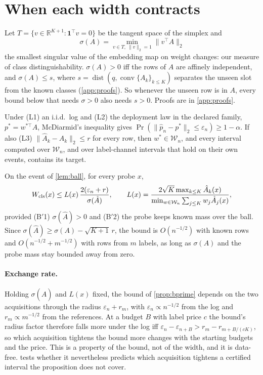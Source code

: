 \section{When each width contracts}
\label{sec:theory}

Let $T=\{v\in\mathbb R^{K+1}:\mathbf 1^{\top}v=0\}$ be the tangent space of the simplex and
\[
\sigma(A)=\min_{v\in T,\ \lVert v\rVert_2=1}\lVert v^{\top}A\rVert_2
\]
the smallest singular value of the embedding map on weight changes: our measure of class
distinguishability. $\sigma(A)>0$ iff the rows of $A$ are affinely independent, and
$\sigma(A)\le s$, where $s=\operatorname{dist}(q,\operatorname{conv}\{A_k\}_{k\le K})$ separates the
unseen slot from the known classes (\cref{app:proofs}). So whenever the unseen row is in $A$, every
bound below that needs $\sigma>0$ also needs $s>0$. Proofs are in \cref{app:proofs}.

\begin{lemma}
\label{lem:ball}
Under (L1) an i.i.d.\ log and (L2) the deployment law in the declared family, $p^{*}=w^{*\top}A$,
McDiarmid's inequality gives $\Pr(\lVert \hat p_n-p^{*}\rVert_2\le\varepsilon_n)\ge 1-\alpha$. If also
(L3) $\lVert\hat A_k-A_k\rVert_2\le r$ for every row, then $w^{*}\in\mathcal W_n$, and every interval
computed over $\mathcal W_n$, and over label-channel intervals that hold on their own events, contains
its target.
\end{lemma}

\begin{proposition}
\label{prop:bprime}
On the event of \cref{lem:ball}, for every probe $x$,
\[
W_{\mathrm{cls}}(x)\le L(x)\,\frac{2(\varepsilon_n+r)}{\sigma(\hat A)},\qquad
L(x)=\frac{2\sqrt{K}\max_{k\le K}\hat A_k(x)}{\min_{w\in\mathcal W_n}\sum_{j\le K}w_j\hat A_j(x)},
\]
provided (B$'$1) $\sigma(\hat A)>0$ and (B$'$2) the probe keeps known mass over the ball. Since
$\sigma(\hat A)\ge\sigma(A)-\sqrt{K+1}\,r$, the bound is $O(n^{-1/2})$ with known rows and
$O(n^{-1/2}+m^{-1/2})$ with rows from $m$ labels, as long as $\sigma(A)$ and the probe mass stay
bounded away from zero.
\end{proposition}

\paragraph{Exchange rate.} Holding $\sigma(\hat A)$ and $L(x)$ fixed, the bound of \cref{prop:bprime}
depends on the two acquisitions through the radius $\varepsilon_n+r_m$, with $\varepsilon_n\propto
n^{-1/2}$ from the log and $r_m\propto m^{-1/2}$ from the references. At a budget $B$ with label price $c$
the bound's radius factor therefore falls more under the log iff
$\varepsilon_{n}-\varepsilon_{n+B}>r_m-r_{m+B/(cK)}$, so which acquisition tightens the bound more changes
with the starting budgets and the price. This is a property of the bound, not of the width, and it is
data-free.  tests whether it nevertheless predicts which acquisition tightens a
certified interval the proposition does not cover.

